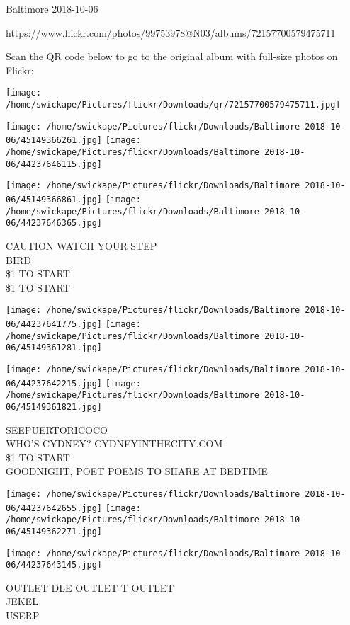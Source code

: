 \documentclass[10pt,letterpaper]{article}
\begin{document}
Baltimore 2018-10-06

https://www.flickr.com/photos/99753978@N03/albums/72157700579475711

Scan the QR code below to go to the original album with full-size photos on Flickr:

\texttt{[image: /home/swickape/Pictures/flickr/Downloads/qr/72157700579475711.jpg]}
\pagebreak

\texttt{[image: /home/swickape/Pictures/flickr/Downloads/Baltimore 2018-10-06/45149366261.jpg]}
\texttt{[image: /home/swickape/Pictures/flickr/Downloads/Baltimore 2018-10-06/44237646115.jpg]}

\texttt{[image: /home/swickape/Pictures/flickr/Downloads/Baltimore 2018-10-06/45149366861.jpg]}
\texttt{[image: /home/swickape/Pictures/flickr/Downloads/Baltimore 2018-10-06/44237646365.jpg]}

CAUTION WATCH YOUR STEP\\
BIRD\\
\$1 TO START\\
\$1 TO START\\
\pagebreak

\texttt{[image: /home/swickape/Pictures/flickr/Downloads/Baltimore 2018-10-06/44237641775.jpg]}
\texttt{[image: /home/swickape/Pictures/flickr/Downloads/Baltimore 2018-10-06/45149361281.jpg]}

\texttt{[image: /home/swickape/Pictures/flickr/Downloads/Baltimore 2018-10-06/44237642215.jpg]}
\texttt{[image: /home/swickape/Pictures/flickr/Downloads/Baltimore 2018-10-06/45149361821.jpg]}

SEEPUERTORICOCO\\
WHO'S CYDNEY?  CYDNEYINTHECITY.COM\\
\$1 TO START\\
GOODNIGHT, POET POEMS TO SHARE AT BEDTIME\\
\pagebreak

\texttt{[image: /home/swickape/Pictures/flickr/Downloads/Baltimore 2018-10-06/44237642655.jpg]}
\texttt{[image: /home/swickape/Pictures/flickr/Downloads/Baltimore 2018-10-06/45149362271.jpg]}

\texttt{[image: /home/swickape/Pictures/flickr/Downloads/Baltimore 2018-10-06/44237643145.jpg]}

OUTLET DLE OUTLET T OUTLET\\
JEKEL\\
USERP\\
\pagebreak
\end{document}
